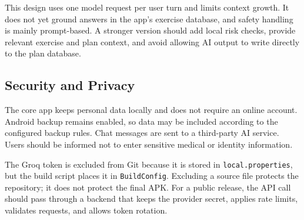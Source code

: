 This design uses one model request per user turn and limits context growth. It does not yet ground answers in the app's exercise database, and safety handling is mainly prompt-based. A stronger version should add local risk checks, provide relevant exercise and plan context, and avoid allowing AI output to write directly to the plan database.

\subsection{Security and Privacy}

The core app keeps personal data locally and does not require an online account. Android backup remains enabled, so data may be included according to the configured backup rules. Chat messages are sent to a third-party AI service. Users should be informed not to enter sensitive medical or identity information.

The Groq token is excluded from Git because it is stored in \texttt{local.properties}, but the build script places it in \texttt{BuildConfig}. Excluding a source file protects the repository; it does not protect the final APK. For a public release, the API call should pass through a backend that keeps the provider secret, applies rate limits, validates requests, and allows token rotation.
